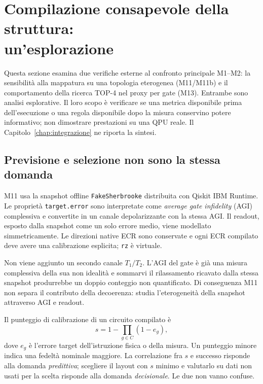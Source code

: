 \section[Compilazione consapevole della struttura: un'esplorazione]{Compilazione consapevole della struttura:\\ un'esplorazione}
\label{app:compilazione}
\begin{onehalfspace}

Questa sezione esamina due verifiche esterne al confronto principale M1--M2: la sensibilit\`a alla mappatura su una topologia eterogenea (M11/M11b) e il comportamento della ricerca TOP-4 nel proxy per gate (M13). Entrambe sono analisi esplorative. Il loro scopo \`e verificare se una metrica disponibile prima dell'esecuzione o una regola disponibile dopo la misura conservino potere informativo; non dimostrare prestazioni su una QPU reale. Il Capitolo~\ref{chap:integrazione} ne riporta la sintesi.

\subsection{Previsione e selezione non sono la stessa domanda}
\label{sec:app_comp_previsione}

M11 usa la snapshot offline \texttt{FakeSherbrooke} distribuita con Qiskit IBM Runtime. Le propriet\`a \texttt{target.error} sono interpretate come \emph{average gate infidelity} (AGI) complessiva e convertite in un canale depolarizzante con la stessa AGI. Il readout, esposto dalla snapshot come un solo errore medio, viene modellato simmetricamente. Le direzioni native ECR sono conservate e ogni ECR compilato deve avere una calibrazione esplicita; \texttt{rz} \`e virtuale.

Non viene aggiunto un secondo canale $T_1/T_2$. L'AGI del gate \`e gi\`a una misura complessiva della sua non idealit\`a e sommarvi il rilassamento ricavato dalla stessa snapshot produrrebbe un doppio conteggio non quantificato. Di conseguenza M11 non separa il contributo della decoerenza: studia l'eterogeneit\`a della snapshot attraverso AGI e readout.

Il punteggio di calibrazione di un circuito compilato \`e
\begin{equation}
    s = 1-\prod_{g\in C}(1-e_g),
\end{equation}
dove $e_g$ \`e l'errore target dell'istruzione fisica o della misura. Un punteggio minore indica una fedelt\`a nominale maggiore. La correlazione fra $s$ e successo risponde alla domanda \emph{predittiva}; scegliere il layout con $s$ minimo e valutarlo su dati non usati per la scelta risponde alla domanda \emph{decisionale}. Le due non vanno confuse.


\end{onehalfspace}

